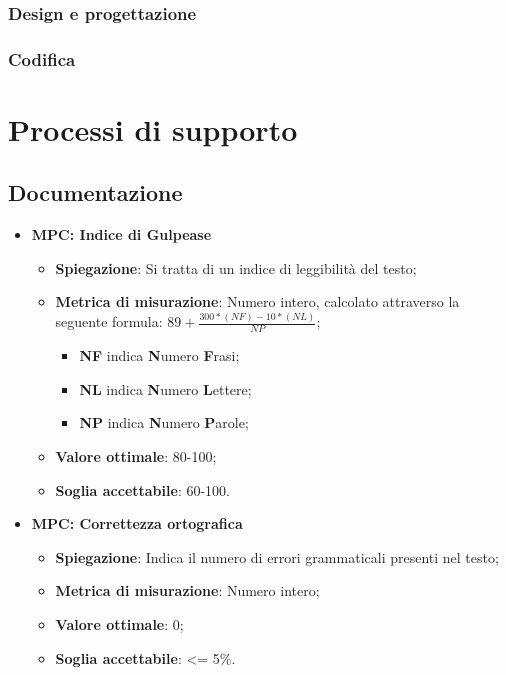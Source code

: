 \subsubsection{Design e progettazione}


\subsubsection{Codifica}


\section{Processi di supporto}


\subsection{Documentazione}
\begin{itemize}
    \item \textbf{MPC: Indice di Gulpease}
    \begin{itemize}
        \item \textbf{Spiegazione}: Si tratta di un indice di leggibilità del testo;
        \item \textbf{Metrica di misurazione}: Numero intero, calcolato attraverso la seguente formula: \textbf{$89 + \frac{300*(NF)-10*(NL)}{NP}$};
            \begin{itemize}
                \item \textbf{NF} indica \textbf{N}umero \textbf{F}rasi;
                \item \textbf{NL} indica \textbf{N}umero \textbf{L}ettere;
                \item \textbf{NP} indica \textbf{N}umero \textbf{P}arole;
            \end{itemize}
        \item \textbf{Valore ottimale}: 80-100;
        \item \textbf{Soglia accettabile}: 60-100.
    \end{itemize}
\end{itemize}

\begin{itemize}
    \item \textbf{MPC: Correttezza ortografica}
    \begin{itemize}
        \item \textbf{Spiegazione}: Indica il numero di errori grammaticali presenti nel testo;
        \item \textbf{Metrica di misurazione}: Numero intero;
        \item \textbf{Valore ottimale}: 0;
        \item \textbf{Soglia accettabile}: <= 5\%.
    \end{itemize}
\end{itemize}

